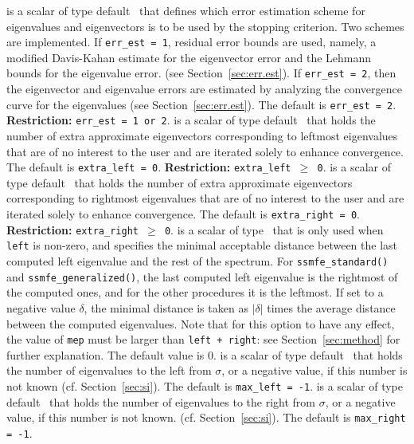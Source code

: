 \begin{description}
%
is a scalar of type default \Integer\ that
defines which error estimation scheme 
for eigenvalues and eigenvectors
is to be used by the stopping criterion.
Two schemes are implemented.
If {\tt err\_est = 1}, residual error bounds are used,
namely,
a modified Davis-Kahan estimate for the eigenvector error
and
the Lehmann bounds for the eigenvalue error.
(see Section~\ref{sec:err.est}).
If {\tt err\_est = 2}, 
then the eigenvector and eigenvalue errors
are estimated by analyzing the convergence curve
for the eigenvalues (see Section~\ref{sec:err.est}).
The default is {\tt err\_est = 2}.
{\bf Restriction:} {\tt err\_est = 1 {\rm or} 2}.
%
is a scalar of type default \Integer\ that
holds the number of extra approximate eigenvectors
corresponding to leftmost eigenvalues
that are of no interest to the user
and are iterated solely to enhance convergence.
The default is {\tt extra\_left = 0}.
{\bf Restriction:} {\tt extra\_left $\ge$ 0}.
%
is a scalar of type default \Integer\ that
holds the number of extra approximate eigenvectors
corresponding to rightmost eigenvalues
that are of no interest to the user
and are iterated solely to enhance convergence.
The default is {\tt extra\_right = 0}.
{\bf Restriction:} {\tt extra\_right $\ge$ 0}.
%
is a scalar of type \REALDP\
that is only used when
{\tt left} is non-zero, and
specifies the minimal acceptable distance
between the last computed left eigenvalue
and the rest of the spectrum.
For {\tt ssmfe\_standard()} and {\tt ssmfe\_generalized()},
the last computed left eigenvalue
is the rightmost of the computed ones,
and for the other procedures
it is the leftmost.
If set to a negative value $\delta$,
the minimal distance is taken as
$|\delta|$ times the average distance between the computed eigenvalues.
Note that for this option to have any effect,
the value of {\tt mep} must be larger than
{\tt left + right}: see Section~\ref{sec:method}
for further explanation.
The default value is 0.
%
is a scalar of type default \Integer\ that
holds the number of eigenvalues to the left from $\sigma$,
or a negative value, if this number is not known
(cf. Section~\ref{sec:si}).
The default is {\tt max\_left = -1}.
%
is a scalar of type default \Integer\ that
holds the number of eigenvalues to the right from $\sigma$,
or a negative value, if this number is not known.
(cf. Section~\ref{sec:si}).
The default is {\tt max\_right = -1}.

\end{description}
